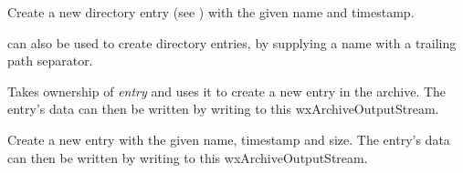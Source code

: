 
Create a new directory entry
(see )
with the given name and timestamp.

 can
also be used to create directory entries, by supplying a name with
a trailing path separator.


\label{wxarchiveoutputstreamputnextentry}


Takes ownership of {\it entry} and uses it to create a new entry in
the archive. The entry's data can then be written by writing to this
wxArchiveOutputStream.


Create a new entry with the given name, timestamp and size. The entry's
data can then be written by writing to this wxArchiveOutputStream.


